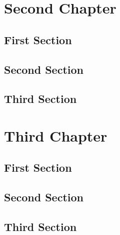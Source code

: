 \documentclass{iasthesis}
\newcommand{\filterminitoc}[1]{#1}
\newcommand{\minitocsection}{\begingroup\renewcommand{\filterminitoc}[1]{}\minitoc\endgroup}
\begin{document}
	\chapter{Second Chapter}
	\minitocsection 
	\kant
	\section{First Section}
	\kant
	\section{Second Section}
	\kant
	\section{Third Section}
	\kant
	
	\chapter{Third Chapter}
	\minitocsection 
	\kant
	\section{First Section}
	\kant
	\section{Second Section}
	\kant
	\section{Third Section}
	\kant
		
\end{document}

